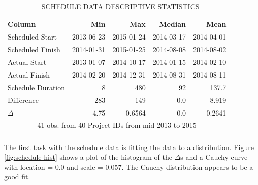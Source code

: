 \documentclass[SDSUThesis.tex]{subfiles}
\begin{document}
            \begin{longtable}{@{}l rr rrr}
                \toprule%
                 \centering%
                 {\bfseries Column}
                 & {\bfseries Min}
                 & {\bfseries Max}
                 & {\bfseries Median}
                 & {\bfseries Mean} \\
                
                \cmidrule[0.2pt](r{0.125em}){1-1}%
                \cmidrule[0.2pt](lr{0.125em}){2-2}%
                \cmidrule[0.2pt](l{0.125em}){3-3}%
                \cmidrule[0.2pt](l{0.125em}){4-4}%
                \cmidrule[0.2pt](l{0.125em}){5-5}%
                \endhead
                
                Scheduled Start & 2013-06-23 & 2015-01-24 & 2014-03-17 & 2014-04-01 \\
                \myrowcolour%
                Scheduled Finish & 2014-01-31 & 2015-01-25 & 2014-08-08 & 2014-08-02 \\
                Actual Start & 2013-01-07 & 2014-10-17 & 2014-01-15  & 2014-02-10 \\
                \myrowcolour%
                Actual Finish & 2014-02-20 & 2014-12-31 & 2014-08-31 & 2014-08-11 \\
                Schedule Duration & 8 & 480 & 92 & 137.7 \\
                \myrowcolour%
                Difference & -283 & 149 & 0.0 & -8.919 \\
                $\Delta$ & -4.75 & 0.6564 & 0.0 & -0.2641 \\
                
                \bottomrule
                
                \multicolumn{5}{c}{41 obs. from 40 Project IDs from mid 2013 to 2015} \\
                
                \caption{SCHEDULE DATA DESCRIPTIVE STATISTICS}
                \label{tab:schedule_desc}
            \end{longtable}
            
            The first task with the schedule data is fitting the data to 
            a distribution.  Figure \ref{fig:schedule-hist} shows
            a plot of the histogram of the $\Delta$s and a
            Cauchy curve with location = 0.0 and scale = 0.057.  The Cauchy
            distribution appears to be a good fit.  
            
\end{document}
